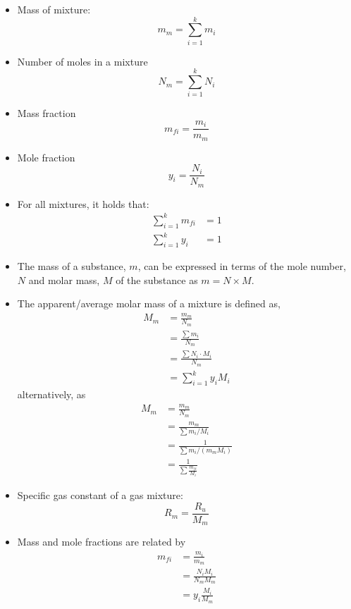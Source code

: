 \begin{itemize}
    \item Mass of mixture:
    \begin{equation*}
        m_m = \sum_{i=1}^{k} m_i
    \end{equation*}
    \item Number of moles in a mixture
    \begin{equation*}
        N_m = \sum_{i=1}^{k} N_i
    \end{equation*}
    \item Mass fraction
    \begin{equation*}
        m_{fi} = \frac{m_i}{m_m}
    \end{equation*}
    \item Mole fraction
    \begin{equation*}
        y_i = \frac{N_i}{N_m}
    \end{equation*}
    \item For all mixtures, it holds that:
    \begin{align*}
        \sum_{i=1}^{k} m_{fi} &= 1 \\
        \sum_{i=1}^{k} y_i &= 1 
    \end{align*}
    \item {\color{blue}The mass of a substance, $m$,} can be expressed in terms of the {\color{blue}mole number, $N$} and {\color{blue}molar mass, $M$} of the substance as {\color{blue}$m=N\times M$}. 
    \item The {\color{blue}apparent/average molar mass of a mixture} is defined as,
    \begin{align*}
        M_m &= \frac{m_m}{N_m}\\
        &=\frac{\sum m_i}{N_m} \\
        &= \frac{\sum N_i \cdot M_i}{N_m} \\
        &= \sum_{i=1}^{k} y_i M_i
    \end{align*}
    alternatively, as
    \begin{align*}
        M_m &= \frac{m_m}{N_m}\\
        &=\frac{m_m}{\sum m_i / M_i}\\ 
        &= \frac{1}{\sum m_i / (m_m M_i)}\\
        &= \frac{1}{\sum \frac{m_{fi}}{M_i}}
    \end{align*}
    \item Specific gas constant of a gas mixture:
    \begin{equation*}
        R_m = \frac{R_u}{M_m}
    \end{equation*}
    \item Mass and mole fractions are related by
    \begin{align*}
        m_{fi} &= \frac{m_i}{m_m} \\
        &= \frac{N_i M_i}{N_m M_m} \\
        &= y_i \frac{M_i}{M_m}
    \end{align*}
\end{itemize}


